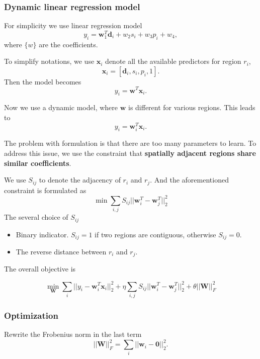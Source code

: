 \subsubsection{Dynamic linear regression model}



For simplicity we use linear regression model
\[
y_i = \mathbf{w}_1^T \mathbf{d}_i + w_2 s_i + w_3 p_i + w_4,
\]
where $\{ w \}$ are the coefficients.

To simplify notations, we use $\mathbf{x}_i$ denote all the available predictors for region $r_i$,
\[
\mathbf{x}_i = [ \mathbf{d}_i, s_i, p_i, 1 ].
\]
Then the model becomes 
\[
y_i = \mathbf{w}^T \mathbf{x}_i.
\]



Now we use a dynamic model, where $\mathbf{w}$ is different for various regions.
This leads to 
\[
y_i  = \mathbf{w}_i^T \mathbf{x}_i.
\]


The problem with formulation is that there are too many parameters to learn. To address this issue, we use the constraint that \textbf{spatially adjacent regions share similar coefficients}.

We use $S_{ij}$ to denote the adjacency of $r_i$ and $r_j$. And the aforementioned constraint is formulated as
\[
\min \sum_{i,j} S_{ij} ||\mathbf{w}_i^T - \mathbf{w}_j^T||_2^2
\] The several choice of $S_{ij}$
\begin{itemize}
\item Binary indicator. $S_{ij} = 1$ if two regions are contiguous, otherwise $S_{ij} = 0$.
\item The reverse distance between $r_i$ and $r_j$. 
\end{itemize}

The overall objective is

\begin{equation}
\label{eq:obj}
\min_{\mathbf{W}}  \sum_i || y_i - \mathbf{w}_i^T \mathbf{x}_i ||_2^2 + \eta \sum_{i,j} S_{ij} ||\mathbf{w}_i^T - \mathbf{w}_j^T||_2^2 
+ \theta || \mathbf{W} ||_F^2
\end{equation}




\subsubsection{Optimization}


Rewrite the Frobenius norm in the last term
\[
|| \mathbf{W} ||_F^2 = \sum_i || \mathbf{w}_i - \mathbf{0}||_2^2.
\]


